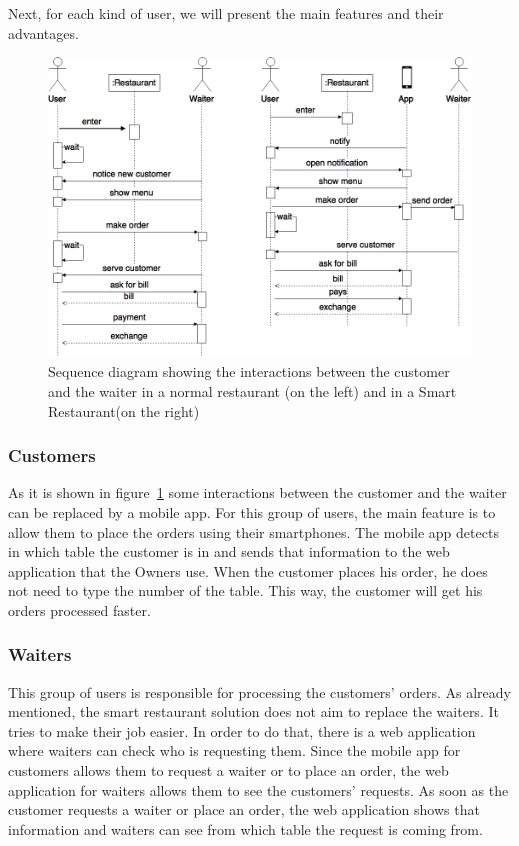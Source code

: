 Next, for each kind of user, we will present the main features and their
advantages.

\begin{figure}[!ht]
  \centering
    \includegraphics[width=1\textwidth]{figures/smart-restaurant}
    \caption{Sequence diagram showing the interactions between
    the customer and the waiter in a normal restaurant (on the left)
    and in a Smart Restaurant(on the right)}
    \label{fig:smart_restaurant}
\end{figure}

\subsubsection{Customers}
\label{sub:customers}
As it is shown in figure~\ref{fig:smart_restaurant} some interactions between
the customer and the waiter can be replaced by a mobile app.
For this group of users, the main feature is to allow them to place
the orders using their smartphones. The mobile app detects in which table
the customer is in and sends that information to the web application that the
Owners use. When the customer places his order, he does not need to type
the number of the table. This way, the customer will get his orders
processed faster.

\subsubsection{Waiters}
\label{sub:waiters}
This group of users is responsible for processing the customers' orders.
As already mentioned, the smart restaurant solution does not aim to replace
the waiters. It tries to make their job easier. In order to do that,
there is a web application where waiters can check who is requesting them.
Since the mobile app for customers allows them to request a waiter or to place
an order, the web application for waiters allows them to see the customers'
requests. As soon as the customer requests a waiter or place an order,
the web application shows that information and waiters can see from which
table the request is coming from.

